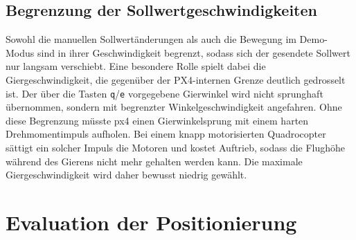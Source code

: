 \subsection*{Begrenzung der Sollwertgeschwindigkeiten}
Sowohl die manuellen Sollwertänderungen als auch die Bewegung im Demo-Modus sind in ihrer Geschwindigkeit begrenzt, sodass sich der gesendete Sollwert nur langsam verschiebt.
Eine besondere Rolle spielt dabei die Giergeschwindigkeit, die gegenüber der PX4-internen Grenze deutlich gedrosselt ist.
Der über die Tasten \texttt{q}/\texttt{e} vorgegebene Gierwinkel wird nicht sprunghaft übernommen, sondern mit begrenzter Winkelgeschwindigkeit angefahren.
Ohne diese Begrenzung müsste \gls{px4} einen Gierwinkelsprung mit einem harten Drehmomentimpuls aufholen.
Bei einem knapp motorisierten Quadrocopter sättigt ein solcher Impuls die Motoren und kostet Auftrieb, sodass die Flughöhe während des Gierens nicht mehr gehalten werden kann.
Die maximale Giergeschwindigkeit wird daher bewusst niedrig gewählt.




\section{Evaluation der Positionierung}



